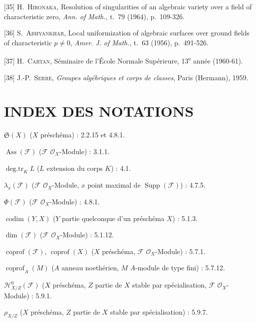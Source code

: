 [35] H.~\textsc{Hironaka}, Resolution of singularities of an
algebraic variety over a field of characteristic zero, \emph{Ann. of Math.},
t.~79 (1964), p.~109-326.

[36] S.~\textsc{Abhyankhar}, Local uniformization of algebraic
surfaces over ground fields of characteristic $p\ne0$, \emph{Amer. J. of
Math.}, t.~63 (1956), p.~491-526.

[37] H.~\textsc{Cartan}, Séminaire de l'École Normale
Supérieure, 13\textsuperscript{e} année (1960-61).

[38] J.-P.~\textsc{Serre}, \emph{Groupes algébriques et corps de
classes}, Paris (Hermann), 1959.

\endgroup

\clearpage
{}
{}
\section*{INDEX DES NOTATIONS}

\begingroup
\small
\setlength{\parindent}{0pt}
\setlength{\parskip}{2pt}

$\mathfrak S(X)$ ($X$ préschéma) : 2.2.15 et 4.8.1.

$\operatorname{Ass}(\mathscr F)$ ($\mathscr F$ $\mathcal O_X$-Module) : 3.1.1.

$\operatorname{deg.tr}_K L$ ($L$ extension du corps $K$) : 4.1.

$\lambda_x(\mathscr F)$ ($\mathscr F$ $\mathcal O_X$-Module, $x$ point maximal
de $\operatorname{Supp}(\mathscr F)$) : 4.7.5.

$\Phi(\mathscr F)$ ($\mathscr F$ $\mathcal O_X$-Module) : 4.8.1.

$\operatorname{codim}(Y,X)$ ($Y$ partie quelconque d'un préschéma $X$) : 5.1.3.

$\dim(\mathscr F)$ ($\mathscr F$ $\mathcal O_X$-Module) : 5.1.12.

$\operatorname{coprof}(\mathscr F)$, $\operatorname{coprof}(X)$ ($X$
préschéma, $\mathscr F$ $\mathcal O_X$-Module) : 5.7.1.

$\operatorname{coprof}_A(M)$ ($A$ anneau noethérien, $M$ $A$-module de type
fini) : 5.7.12.

$\mathcal H^0_{X/Z}(\mathscr F)$ ($X$ préschéma, $Z$ partie de $X$ stable par
spécialisation, $\mathscr F$ $\mathcal O_X$-Module) : 5.9.1.

$\rho_{X/Z}$ ($X$ préschéma, $Z$ partie de $X$ stable par
spécialisation) : 5.9.7.

